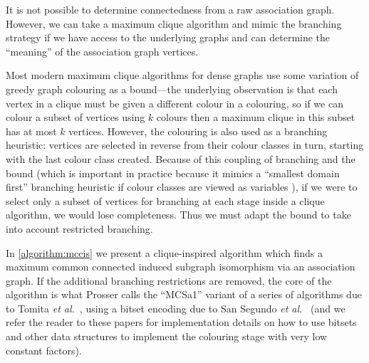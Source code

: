 \documentclass{llncs}
\begin{document}
It is not possible to determine connectedness from a raw association graph. However, we can take a
maximum clique algorithm and mimic the branching strategy if we have access to the underlying graphs
and can determine the ``meaning'' of the association graph vertices.

Most modern maximum clique algorithms for dense graphs use some variation of greedy graph colouring
as a bound---the underlying observation is that each vertex in a clique must be given a different
colour in a colouring, so if we can colour a subset of vertices using $k$ colours then a maximum
clique in this subset has at most $k$ vertices. However, the colouring is also used as a branching
heuristic: vertices are selected in reverse from their colour classes in turn, starting with the
last colour class created. Because of this coupling of branching and the bound (which is important
in practice because it mimics a ``smallest domain first'' branching heuristic if colour classes are
viewed as variables \cite{DBLP:conf/cp/McCreeshP14}), if we were to select only a subset of vertices for
branching at each stage inside a clique algorithm, we would lose completeness. Thus we must adapt
the bound to take into account restricted branching.

In \cref{algorithm:mccis} we present a clique-inspired algorithm which finds a maximum common
connected induced subgraph isomorphism via an
association graph. If the additional
branching restrictions are removed, the core of the algorithm is what Prosser
\cite{DBLP:journals/algorithms/Prosser12} calls the ``MCSa1'' variant of a series of algorithms due
to Tomita \textit{et al.}\
\cite{DBLP:conf/dmtcs/TomitaS03,DBLP:journals/jgo/TomitaK07,DBLP:conf/walcom/TomitaSHTW10}, using a
bitset encoding due to San Segundo \textit{et al.}\
\cite{DBLP:journals/cor/SegundoRJ11,DBLP:journals/ol/SegundoMRH13} (and we refer the reader to these
papers for implementation details on how to use bitsets and other data structures to implement the
colouring stage with very low constant factors).
\end{document}
